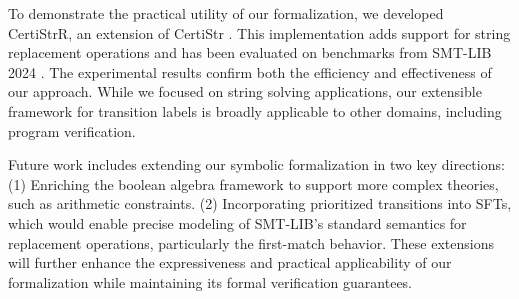 \documentclass[a4paper,UKenglish,cleveref, autoref, thm-restate]{lipics-v2021}
\begin{document}
To demonstrate the practical utility of our formalization, we developed CertiStrR, an extension of CertiStr \cite{cpp/KanLRS22}. This implementation adds support for string replacement operations and has been evaluated on benchmarks from SMT-LIB 2024 \cite{smtlib_benchmarks}. The experimental results confirm both the efficiency and effectiveness of our approach. While we focused on string solving applications, our extensible framework for transition labels is broadly applicable to other domains, including program verification.

Future work includes extending our symbolic formalization in two key directions:
%
(1) Enriching the boolean algebra framework to support more complex theories, such as arithmetic constraints.
(2) Incorporating prioritized transitions into SFTs, which would enable precise modeling of SMT-LIB's standard semantics for replacement operations, particularly the first-match behavior.
These extensions will further enhance the expressiveness and practical applicability of our formalization while maintaining its formal verification guarantees.




\end{document}
